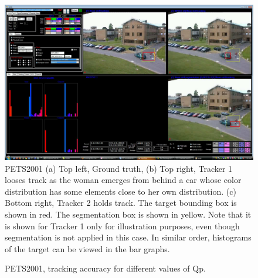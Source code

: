 \documentclass{article}
\begin{document}
\begin{figure}
			\centering
			\includegraphics[width=.45\textwidth]{figs/ICIP2009_PETS2001_FN_00592_snapshotVVG}
			\caption{PETS2001  (a) Top left, Ground truth, (b) Top right, Tracker 1 looses track as the woman emerges from behind a car whose color distribution has some elements close to her own distribution.  (c) Bottom right, Tracker 2 holds track.  The target bounding box is shown in red.  The segmentation box is shown in yellow.  Note that it is shown for Tracker 1 only for illustration purposes, even though segmentation is not applied in this case.  In similar order, histograms of the target can be viewed in the bar graphs.}
\label{fig:PETS2001_Frame_592_small_size}
\end{figure}

\begin{figure}
			\centering

			\caption{PETS2001, tracking accuracy for different values of Qp.} 	
			\label{fig:Accuracy_PETS2001}	
			
\end{figure}
\end{document}

